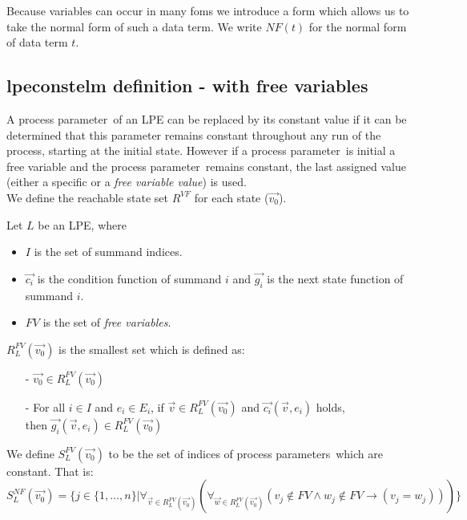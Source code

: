 \index{}\documentclass[a4paper,10pt]{article}
\theoremstyle{plain}
\theoremstyle{definition}
\newcommand{\ovr}{\overrightarrow}
\newcommand{\pp}{process parameter}
\newcommand{\pps}{process parameters}
\newcommand{\ti}{\textit}
\begin{document}
Because variables can occur in many foms we introduce a form which allows us to take the normal form of such a data term. 
We write $NF(t)$ for the normal form of data term $t$. 

\subsection{lpeconstelm definition - with free variables}

A \pp\ of an LPE can be replaced by its constant value if it can be determined that this parameter remains constant throughout any run of the process, starting at the initial state. However if a \pp\ is initial a free variable and the \pp\ remains constant, the last assigned value (either a specific or a \ti{free variable value}) is used.\\

We define the reachable state set $R^{VF}$ for each state ($\ovr{v_0}$). 
\begin{defn}\label{def:lpe} Let $L$ be an LPE, where\begin{itemize}
\item $I$ is the set of summand indices.
\item $\ovr{c_i}$ is the condition function of summand $i$ and $\ovr{g_i}$ is the next state function of summand $i$.
\item $FV$ is the set of \ti{free variables}.\\
\end{itemize}

$R_L^{FV}(\ovr{v_0})$ is the smallest set which is defined as:
  \begin{itemize}
    \item[-] $\ovr{v_0} \in R_L^{FV}(\ovr{v_0})$
    \item[-] For all $i \in I$ and $e_i \in E_i$, if $\ovr{v} \in R_L^{FV}(\ovr{v_0})$ and $\ovr{c_i}(\ovr{v}, e_i)$ holds, \\ then $\ovr{g_i}(\ovr{v}, e_i) \in R_L^{FV}(\ovr{v_0})$ \\
   \end{itemize}
\end{defn}

\begin{defn}\label{def:lpe_comp_fv} We define $S_L^{FV}(\ovr{v_0})$ to be the set of indices of \pps\ which are constant. That is:\\

$S_L^{NF}(\ovr{v_0}) = \lbrace j \in  \lbrace 1, \ldots, n \rbrace \vert \forall_{\ovr{v} \in R_L^{FV}
(\ovr{v_0})}(\forall_{\ovr{w} \in R_L^{FV}(\ovr{v_0})}( v_j \not\in FV \wedge w_j \not\in FV \rightarrow ( v_j = w_j)))
\rbrace $
\end{defn}
\end{document}
